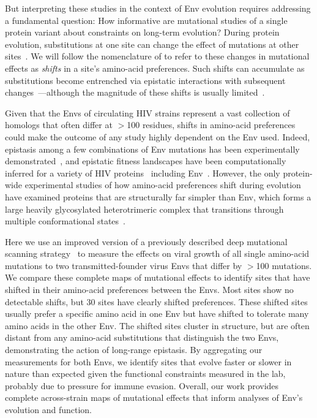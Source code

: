 \documentclass[9pt]{elife}
\begin{document}
But interpreting these studies in the context of Env evolution requires addressing a fundamental question: How informative are mutational studies of a single protein variant about constraints on long-term evolution?
During protein evolution, substitutions at one site can change the effect of mutations at other sites~\citep{natarajan2013epistasis,gong2013stability,harms2014historical,podgornaia2015pervasive,starr2016epistasis,klink2017parallel}.
We will follow the nomenclature of \citet{pollock2012amino} to refer to these changes in mutational effects as \emph{shifts} in a site's amino-acid preferences.
Such shifts can accumulate as substitutions become entrenched via epistatic interactions with subsequent changes~\citep{starr2017pervasive,pollock2012amino,shah2015contingency,bazykin2015changing}---although the magnitude of these shifts is usually limited~\citep{doud2015site,chan2017correlation,ashenberg2013mutational,risso2014mutational}.

Given that the Envs of circulating HIV strains represent a vast collection of homologs that often differ at $>$100 residues, shifts in amino-acid preferences could make the outcome of any study highly dependent on the Env used.
Indeed, epistasis among a few combinations of Env mutations has been experimentally demonstrated~\citep{da2010fitness}, and epistatic fitness landscapes have been computationally inferred for a variety of HIV proteins~\citep{kouyos2012exploring,ferguson2013translating,mann2014fitness,barton2015scaling} including Env~\citep{louie2018fitness}. 
However, the only protein-wide experimental studies of how amino-acid preferences shift during evolution have examined proteins that are structurally far simpler than Env, which forms a large heavily glycosylated heterotrimeric complex that transitions through multiple conformational states~\citep{munro2014conformational,ozorowski2017open}.

Here we use an improved version of a previously described deep mutational scanning strategy~\citep{haddox2016experimental} to measure the effects on viral growth of all single amino-acid mutations to two transmitted-founder virus Envs that differ by $>$100 mutations.
We compare these complete maps of mutational effects to identify sites that have shifted in their amino-acid preferences between the Envs.
Most sites show no detectable shifts, but 30 sites have clearly shifted preferences.
These shifted sites usually prefer a specific amino acid in one Env but have shifted to tolerate many amino acids in the other Env.
The shifted sites cluster in structure, but are often distant from any amino-acid substitutions that distinguish the two Envs, demonstrating the action of long-range epistasis.
By aggregating our measurements for both Envs, we identify sites that evolve faster or slower in nature than expected given the functional constraints measured in the lab, probably due to pressure for immune evasion.
Overall, our work provides complete across-strain maps of mutational effects that inform analyses of Env's evolution and function.
\end{document}
